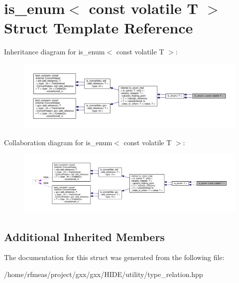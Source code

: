 \hypertarget{structis__enum_3_01const_01volatile_01T_01_4}{}\section{is\+\_\+enum$<$ const volatile T $>$ Struct Template Reference}
\label{structis__enum_3_01const_01volatile_01T_01_4}


Inheritance diagram for is\+\_\+enum$<$ const volatile T $>$\+:
\nopagebreak
\begin{figure}[H]
\begin{center}
\leavevmode
\includegraphics[width=350pt]{structis__enum_3_01const_01volatile_01T_01_4__inherit__graph}
\end{center}
\end{figure}


Collaboration diagram for is\+\_\+enum$<$ const volatile T $>$\+:
\nopagebreak
\begin{figure}[H]
\begin{center}
\leavevmode
\includegraphics[width=350pt]{structis__enum_3_01const_01volatile_01T_01_4__coll__graph}
\end{center}
\end{figure}
\subsection*{Additional Inherited Members}


The documentation for this struct was generated from the following file\+:\begin{DoxyCompactItemize}
\item 
/home/rfmeas/project/gxx/gxx/\+H\+I\+D\+E/utility/type\+\_\+relation.\+hpp\end{DoxyCompactItemize}
